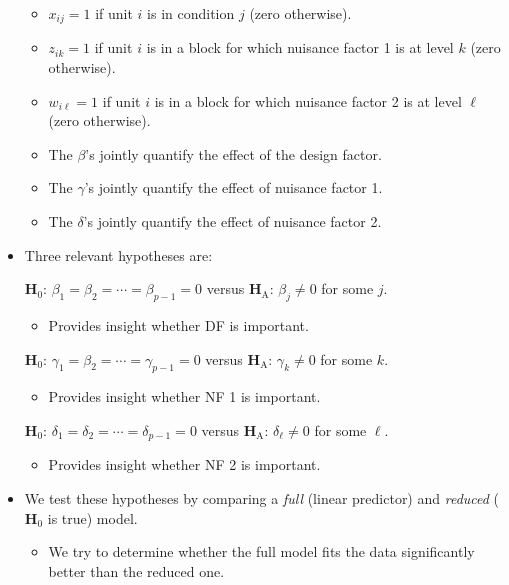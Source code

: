 \begin{itemize}
            \begin{itemize}
                  \item $ x_{ij}=1 $ if unit $ i $ is in condition $ j $ (zero otherwise).
                  \item $ z_{ik}=1 $ if unit $ i $ is in a block for which nuisance factor 1 is at level $ k $ (zero otherwise).
                  \item $ w_{i\ell}=1 $ if unit $ i $ is in a block for which nuisance factor 2 is at level $ \ell $ (zero otherwise).
                  \item The $\beta$'s jointly quantify the effect of the design factor.
                  \item The $\gamma$'s jointly quantify the effect of nuisance factor 1.
                  \item The $\delta$'s jointly quantify the effect of nuisance factor 2.
            \end{itemize}
      \item Three relevant hypotheses are:
            \begin{tightcenter}
                  $ \mathbf{H}_0 $: $ \beta_1=\beta_2=\cdots=\beta_{p-1}=0 $ versus $ \mathbf{H}_\text{A} $: $ \beta_j\ne 0$ for some $ j $.
                  \begin{itemize}
                        \item Provides insight whether DF is important.
                  \end{itemize}
                  $ \mathbf{H}_0 $: $ \gamma_1=\beta_2=\cdots=\gamma_{p-1}=0 $ versus $ \mathbf{H}_\text{A} $: $ \gamma_k\ne 0$ for some $ k $.
                  \begin{itemize}
                        \item Provides insight whether NF 1 is important.
                  \end{itemize}
                  $ \mathbf{H}_0 $: $ \delta_1=\delta_2=\cdots=\delta_{p-1}=0 $ versus $ \mathbf{H}_\text{A} $: $ \delta_\ell\ne 0$ for some $ \ell $.
                  \begin{itemize}
                        \item Provides insight whether NF 2 is important.
                  \end{itemize}
            \end{tightcenter}
      \item We test these hypotheses by comparing a \emph{full} (linear predictor) and \emph{reduced} ($ \mathbf{H}_0 $ is true) model.
            \begin{itemize}
                  \item We try to determine whether the full model fits the data significantly better than the reduced one.
            \end{itemize}
\end{itemize}

